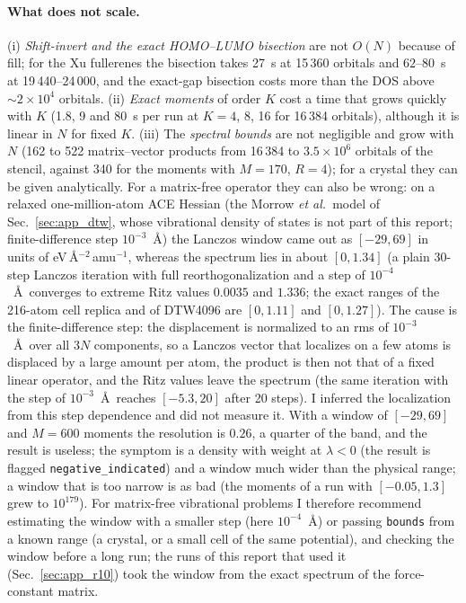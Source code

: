 \documentclass[reprint,nofootinbib,superscriptaddress,amsmath,amssymb,aps,prb,floatfix]{revtex4-2}
\begin{document}
\paragraph*{What does not scale.}
(i) \emph{Shift-invert and the exact HOMO--LUMO bisection} are not $O(N)$ because of fill; for the Xu fullerenes the bisection takes 27~s at 15\,360 orbitals and $62$--$80$~s at 19\,440--24\,000, and the exact-gap bisection costs more than the DOS above $\sim2\times10^4$ orbitals.
(ii) \emph{Exact moments} of order $K$ cost a time that grows quickly with $K$ (1.8, 9 and 80~s per run at $K=4$, 8, 16 for 16\,384 orbitals), although it is linear in $N$ for fixed $K$.
(iii) The \emph{spectral bounds} are not negligible and grow with $N$ (162 to 522 matrix--vector products from 16\,384 to $3.5\times10^6$ orbitals of the stencil, against 340 for the moments with $M=170$, $R=4$); for a crystal they can be given analytically. For a matrix-free operator they can also be wrong: on a relaxed one-million-atom ACE Hessian (the Morrow \emph{et al.}\ model of Sec.~\ref{sec:app_dtw}, whose vibrational density of states is not part of this report; finite-difference step $10^{-3}$~\AA) the Lanczos window came out as $[-29,69]$ in units of eV\,\AA$^{-2}$\,amu$^{-1}$, whereas the spectrum lies in about $[0,1.34]$ (a plain 30-step Lanczos iteration with full reorthogonalization and a step of $10^{-4}$~\AA\ converges to extreme Ritz values $0.0035$ and $1.336$; the exact ranges of the 216-atom cell replica and of DTW4096 are $[0,1.11]$ and $[0,1.27]$). The cause is the finite-difference step: the displacement is normalized to an rms of $10^{-3}$~\AA\ over all $3N$ components, so a Lanczos vector that localizes on a few atoms is displaced by a large amount per atom, the product is then not that of a fixed linear operator, and the Ritz values leave the spectrum (the same iteration with the step of $10^{-3}$~\AA\ reaches $[-5.3,20]$ after 20 steps). I inferred the localization from this step dependence and did not measure it. With a window of $[-29,69]$ and $M=600$ moments the resolution is $0.26$, a quarter of the band, and the result is useless; the symptom is a density with weight at $\lambda<0$ (the result is flagged \texttt{negative\_indicated}) and a window much wider than the physical range; a window that is too narrow is as bad (the moments of a run with $[-0.05,1.3]$ grew to $10^{179}$). For matrix-free vibrational problems I therefore recommend estimating the window with a smaller step (here $10^{-4}$~\AA) or passing \texttt{bounds} from a known range (a crystal, or a small cell of the same potential), and checking the window before a long run; the runs of this report that used it (Sec.~\ref{sec:app_r10}) took the window from the exact spectrum of the force-constant matrix.
\end{document}
